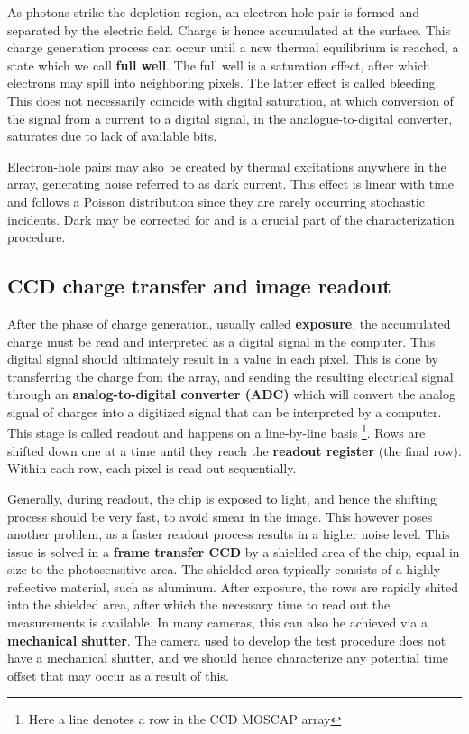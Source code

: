 \documentclass[../main.tex]{subfiles}
\begin{document}
	As photons strike the depletion region, an electron-hole pair is formed and separated by the electric field. Charge is hence accumulated at the surface. This charge generation process can occur until a new thermal equilibrium is reached, a state which we call \textbf{full well}. The full well is a saturation effect, after which electrons may spill into neighboring pixels. The latter effect is called bleeding. This does not necessarily coincide with digital saturation, at which conversion of the signal from a current to a digital signal, in the analogue-to-digital converter, saturates due to lack of available bits. 
	
	Electron-hole pairs may also be created by thermal excitations anywhere in the array, generating noise referred to as dark current. This effect is linear with time and follows a Poisson distribution since they are rarely occurring stochastic incidents. Dark may be corrected for and is a crucial part of the characterization procedure.  
	
	\subsection{CCD charge transfer and image readout}
	After the phase of charge generation, usually called \textbf{exposure}, the accumulated charge must be read and interpreted as a digital signal in the computer. This digital signal should ultimately result in a value in each pixel. This is done by transferring the charge from the array, and sending the resulting electrical signal through an \textbf{analog-to-digital converter (ADC)} which will convert the analog signal of charges into a digitized signal that can be interpreted by a computer. This stage is called readout and happens on a line-by-line basis \footnote{Here a line denotes a row in the CCD MOSCAP array}. Rows are shifted down one at a time until they reach the \textbf{readout register} (the final row). Within each row, each pixel is read out sequentially.  
	
	Generally, during readout, the chip is exposed to light, and hence the shifting process should be very fast, to avoid smear in the image. This however poses another problem, as a faster readout process results in a higher noise level. This issue is solved in a \textbf{frame transfer CCD} by a shielded area of the chip, equal in size to the photosensitive area. The shielded area typically consists of a highly reflective material, such as aluminum. After exposure, the rows are rapidly shited into the shielded area, after which the necessary time to read out the measurements is available. In many cameras, this can also be achieved via a \textbf{mechanical shutter}. The camera used to develop the test procedure does not have a mechanical shutter, and we should hence characterize any potential time offset that may occur as a result of this.
	
\end{document}
